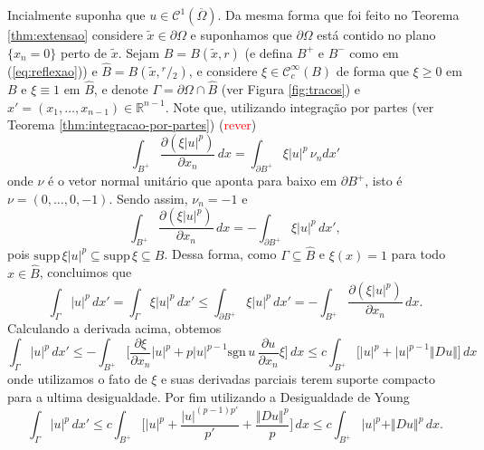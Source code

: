 \documentclass[a4paper, 11pt]{book}
\theoremstyle{definition}
\newcommand{\bR}{\mathbb{R}}
\newcommand{\cC}{\mathcal{C}}
\newcommand{\supp}{\mathrm{supp}\,}
\newcommand{\sgn}{\mathrm{sgn}}
\newcommand{\sfrac}[2]{{}^{#1}\!\!/\!_{#2}}
\begin{document}
\begin{prf}
    Incialmente suponha que $u \in \cC^1(\overline{\Omega})$. Da mesma forma que foi feito no Teorema \ref{thm:extensao} considere $\tilde x \in \partial\Omega$ e suponhamos que $\partial\Omega$ está contido no plano $\{x_n = 0\}$ perto de $\tilde x$.
    Sejam $B = B(\tilde x, r)$ (e defina $B^+$ e $B^-$ como em (\ref{eq:reflexao})) e $\widehat B = B(\tilde x, \sfrac{r}{2})$,
    e considere $\xi \in \cC^{\infty}_c(B)$ de forma que $\xi \geqslant 0$ em $B$ e $\xi \equiv 1$ em $\widehat B$, e denote $\Gamma = \partial \Omega \cap \widehat B$ (ver Figura \ref{fig:tracos}) e $x' = (x_1,\dots,x_{n-1}) \in \bR^{n-1}$.
    Note que, utilizando integração por partes (ver Teorema \ref{thm:integracao-por-partes}) (\textcolor{red}{rever})
    \[
        \int_{B^+} \dfrac{\partial (\xi |u|^p)}{\partial x_n}\,dx = \int_{\partial B^+} \xi |u|^p \, \nu_n dx'
    \]
    onde $\nu$ é o vetor normal unitário que aponta para baixo em $\partial B^+$, isto é $\nu =  (0,\dots,0,-1)$. Sendo assim, $\nu_n = -1$ e 
    \[
        \int_{B^+} \dfrac{\partial (\xi |u|^p)}{\partial x_n} \,dx = -\int_{\partial B^+} \xi |u|^p \,dx',
    \]
    pois $\supp \xi |u|^p \subseteq \supp \xi  \subseteq B$.
    Dessa forma, como $\Gamma \subseteq \hat B$ e $\xi(x) = 1$ para todo $x \in \hat B$, concluimos que
    \[
        \int_{\Gamma} |u|^p \,dx' = \int_{\Gamma} \xi|u|^p \,dx' \leqslant \int_{\partial B^+} \xi|u|^p \,dx' = -\int_{B^+} \dfrac{\partial (\xi |u|^p)}{\partial x_n} \,dx.
    \]
    Calculando a derivada acima, obtemos
    \[
        \int_\Gamma |u|^p \,dx' \leqslant - \int_{B^+} \Big[ \dfrac{\partial \xi}{\partial x_n} |u|^p + p|u|^{p-1} \sgn\,u\,\dfrac{\partial u}{\partial x_n} \xi \Big] \,dx \leqslant c \int_{B^+} \Big[ |u|^p + |u|^{p-1} \Vert Du \Vert \Big] \,dx
    \]
    onde utilizamos o fato de $\xi$ e suas derivadas parciais terem suporte compacto para a ultima desigualdade. Por fim utilizando a Desigualdade de Young
    \begin{equation} \label{eq:umaisdu}
        \int_\Gamma |u|^p \,dx' \leqslant c \int_{B^+} \bigg[ |u|^p + \frac{|u|^{(p-1)p'}}{p'} + \frac{\Vert Du \Vert^p}{p} \bigg] \,dx \leqslant c \int_{B^+} |u|^p + \Vert Du \Vert^p \,dx.
    \end{equation}

    \begin{figure}
        \centering
\end{figure}
\end{prf}
\end{document}
